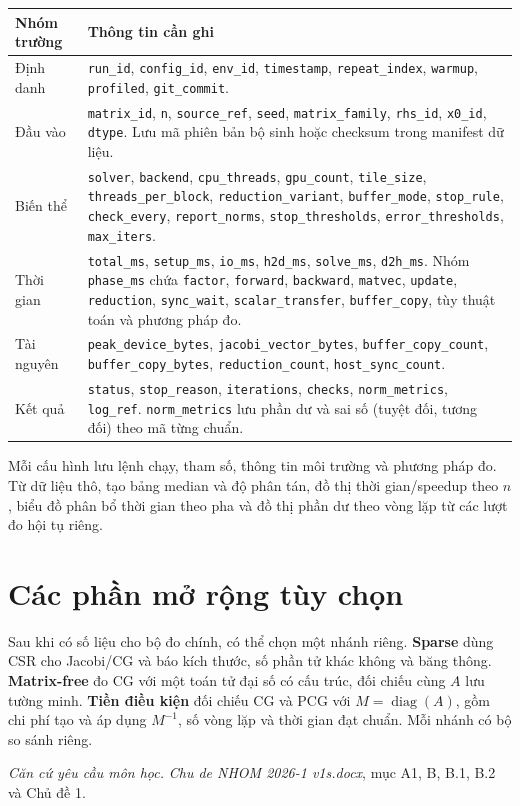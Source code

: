 \documentclass[11pt,a4paper]{article}
\newcommand{\field}[1]{\texttt{#1}}
\begin{document}
\smallskip
{\small
\noindent\begin{tabularx}{\textwidth}{@{}p{}Y@{}}
\toprule
Nhóm trường & Thông tin cần ghi \\
\midrule
Định danh &
\field{run\_id}, \field{config\_id}, \field{env\_id},
\field{timestamp}, \field{repeat\_index}, \field{warmup},
\field{profiled}, \field{git\_commit}. \\
\addlinespace
Đầu vào &
\field{matrix\_id}, \field{n}, \field{source\_ref}, \field{seed},
\field{matrix\_family},
\field{rhs\_id}, \field{x0\_id}, \field{dtype}.
Lưu mã phiên bản bộ sinh hoặc checksum trong manifest dữ liệu. \\
\addlinespace
Biến thể &
\field{solver}, \field{backend}, \field{cpu\_threads}, \field{gpu\_count},
\field{tile\_size}, \field{threads\_per\_block},
\field{reduction\_variant}, \field{buffer\_mode},
\field{stop\_rule}, \field{check\_every}, \field{report\_norms},
\field{stop\_thresholds}, \field{error\_thresholds}, \field{max\_iters}. \\
\addlinespace
Thời gian &
\field{total\_ms}, \field{setup\_ms}, \field{io\_ms},
\field{h2d\_ms}, \field{solve\_ms}, \field{d2h\_ms}.
Nhóm \field{phase\_ms} chứa \field{factor}, \field{forward},
\field{backward}, \field{matvec}, \field{update}, \field{reduction},
\field{sync\_wait}, \field{scalar\_transfer}, \field{buffer\_copy},
tùy thuật toán và phương pháp đo. \\
\addlinespace
Tài nguyên &
\field{peak\_device\_bytes}, \field{jacobi\_vector\_bytes},
\field{buffer\_copy\_count}, \field{buffer\_copy\_bytes},
\field{reduction\_count}, \field{host\_sync\_count}. \\
\addlinespace
Kết quả &
\field{status}, \field{stop\_reason}, \field{iterations},
\field{checks}, \field{norm\_metrics}, \field{log\_ref}.
\field{norm\_metrics} lưu phần dư và sai số (tuyệt đối, tương đối) theo
mã từng chuẩn. \\
\bottomrule
\end{tabularx}\par
}

\smallskip
\noindent Mỗi cấu hình lưu lệnh chạy, tham số, thông tin môi trường và
phương pháp đo. Từ dữ liệu thô, tạo bảng median và độ phân tán, đồ thị
thời gian/speedup theo $n$, biểu đồ phân bổ thời gian theo pha và đồ thị
phần dư theo vòng lặp từ các lượt đo hội tụ riêng.

\section{Các phần mở rộng tùy chọn}

Sau khi có số liệu cho bộ đo chính, có thể chọn một nhánh riêng.
\textbf{Sparse} dùng CSR cho Jacobi/CG và báo kích thước, số phần tử
khác không và băng thông. \textbf{Matrix-free} đo CG với một toán tử
đại số có cấu trúc, đối chiếu cùng $A$ lưu tường minh.
\textbf{Tiền điều kiện} đối chiếu CG và PCG với $M=\operatorname{diag}(A)$,
gồm chi phí tạo và áp dụng $M^{-1}$, số vòng lặp và thời gian đạt chuẩn.
Mỗi nhánh có bộ so sánh riêng.

\smallskip
\noindent\textit{Căn cứ yêu cầu môn học.} \emph{Chu de NHOM 2026-1 v1s.docx},
mục A1, B, B.1, B.2 và Chủ đề 1.
\end{document}
